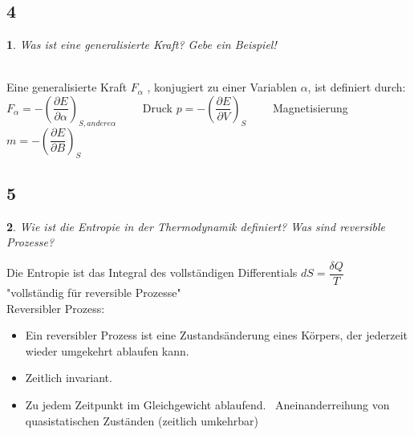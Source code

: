 \documentclass[12pt,a4paper]{report}
\newtheorem{myfrag}{}%
\begin{document}
\subsection{4}
\begin{myfrag}
Was ist eine generalisierte Kraft? Gebe ein Beispiel!
\end{myfrag} \quad \\
Eine generalisierte Kraft $F_\alpha$ , konjugiert zu einer Variablen $\alpha$, ist definiert durch: \\[2ex]
$F_\alpha = - \left( \dfrac{\partial E}{\partial \alpha} \right) _{S,andere \alpha}\qquad $ Druck
$p = -\left(\dfrac{\partial E}{\partial V} \right) _S \qquad
$ Magnetisierung
$m= -\left(\dfrac{\partial E}{\partial B} \right) _S $
\subsection{5}
\begin{myfrag}
Wie ist die Entropie in der Thermodynamik definiert? Was sind
reversible Prozesse?
\end{myfrag}
Die Entropie ist das Integral des vollständigen Differentials $dS = \dfrac{\delta Q}{T}$ \\"vollständig für reversible Prozesse" \\[2ex]
Reversibler Prozess:
\begin{itemize}
\item Ein reversibler Prozess ist eine Zustandsänderung eines Körpers, der jederzeit wieder umgekehrt ablaufen kann.
\item Zeitlich invariant. 
\item Zu jedem Zeitpunkt im Gleichgewicht ablaufend.
\ Aneinanderreihung von quasistatischen Zuständen (zeitlich umkehrbar)
\end{itemize} 
\end{document}
